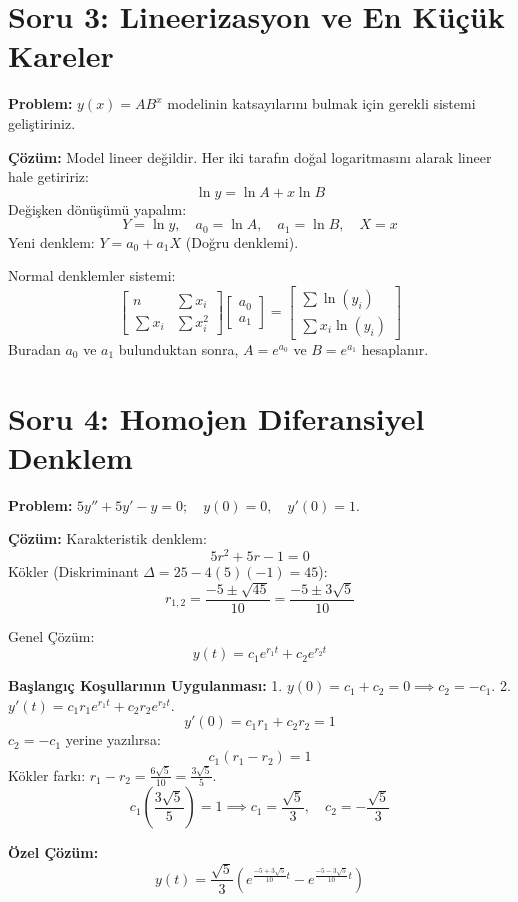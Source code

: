 \documentclass[12pt, a4paper]{article}
\begin{document}
\vspace{1cm}

\section*{Soru 3: Lineerizasyon ve En Küçük Kareler}
\textbf{Problem:} $y(x) = A B^x$ modelinin katsayılarını bulmak için gerekli sistemi geliştiriniz.

\textbf{Çözüm:}
Model lineer değildir. Her iki tarafın doğal logaritmasını alarak lineer hale getiririz:
\[ \ln y = \ln A + x \ln B \]
Değişken dönüşümü yapalım:
\[ Y = \ln y, \quad a_0 = \ln A, \quad a_1 = \ln B, \quad X = x \]
Yeni denklem: $Y = a_0 + a_1 X$ (Doğru denklemi).

Normal denklemler sistemi:
\begin{equation*}
\begin{bmatrix}
n & \sum x_i \\
\sum x_i & \sum x_i^2
\end{bmatrix}
\begin{bmatrix}
a_0 \\ a_1
\end{bmatrix}
=
\begin{bmatrix}
\sum \ln(y_i) \\
\sum x_i \ln(y_i)
\end{bmatrix}
\end{equation*}
Buradan $a_0$ ve $a_1$ bulunduktan sonra, $A = e^{a_0}$ ve $B = e^{a_1}$ hesaplanır.

\newpage

\section*{Soru 4: Homojen Diferansiyel Denklem}
\textbf{Problem:} $5y'' + 5y' - y = 0; \quad y(0)=0, \quad y'(0)=1$.

\textbf{Çözüm:}
Karakteristik denklem:
\[ 5r^2 + 5r - 1 = 0 \]
Kökler (Diskriminant $\Delta = 25 - 4(5)(-1) = 45$):
\[ r_{1,2} = \frac{-5 \pm \sqrt{45}}{10} = \frac{-5 \pm 3\sqrt{5}}{10} \]

Genel Çözüm:
\[ y(t) = c_1 e^{r_1 t} + c_2 e^{r_2 t} \]

\textbf{Başlangıç Koşullarının Uygulanması:}
1. $y(0) = c_1 + c_2 = 0 \implies c_2 = -c_1$.
2. $y'(t) = c_1 r_1 e^{r_1 t} + c_2 r_2 e^{r_2 t}$.
\[ y'(0) = c_1 r_1 + c_2 r_2 = 1 \]
$c_2 = -c_1$ yerine yazılırsa:
\[ c_1(r_1 - r_2) = 1 \]
Kökler farkı: $r_1 - r_2 = \frac{6\sqrt{5}}{10} = \frac{3\sqrt{5}}{5}$.
\[ c_1 \left(\frac{3\sqrt{5}}{5}\right) = 1 \implies c_1 = \frac{\sqrt{5}}{3}, \quad c_2 = -\frac{\sqrt{5}}{3} \]

\textbf{Özel Çözüm:}
\begin{equation*}
    \boxed{y(t) = \frac{\sqrt{5}}{3} \left( e^{\frac{-5 + 3\sqrt{5}}{10} t} - e^{\frac{-5 - 3\sqrt{5}}{10} t} \right)}
\end{equation*}
\end{document}
